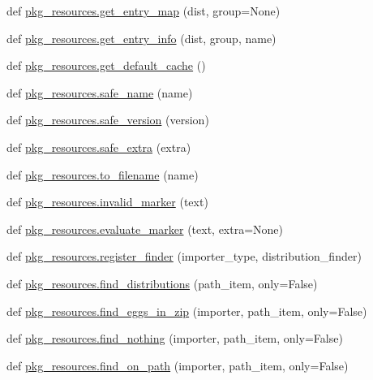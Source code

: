 \begin{DoxyCompactItemize}
\item 
def \hyperlink{namespacepkg__resources_ad16e5d5879cbf9b5302b755ae1d0e5c2}{pkg\+\_\+resources.\+get\+\_\+entry\+\_\+map} (dist, group=None)
\item 
def \hyperlink{namespacepkg__resources_afbe243e1bf56cc04e07807c30e8b8145}{pkg\+\_\+resources.\+get\+\_\+entry\+\_\+info} (dist, group, name)
\item 
def \hyperlink{namespacepkg__resources_a605d91f78bde46cd2f7db04c78b9c28c}{pkg\+\_\+resources.\+get\+\_\+default\+\_\+cache} ()
\item 
def \hyperlink{namespacepkg__resources_a9635d106e0984b74bbcd80646e7a7384}{pkg\+\_\+resources.\+safe\+\_\+name} (name)
\item 
def \hyperlink{namespacepkg__resources_a20ac952ffecf95bf3d88e9a15251ab80}{pkg\+\_\+resources.\+safe\+\_\+version} (version)
\item 
def \hyperlink{namespacepkg__resources_a60b77b0c5890f9f0087fe9b6055f138f}{pkg\+\_\+resources.\+safe\+\_\+extra} (extra)
\item 
def \hyperlink{namespacepkg__resources_a6c980c35b437e195d4ab09e4fac70626}{pkg\+\_\+resources.\+to\+\_\+filename} (name)
\item 
def \hyperlink{namespacepkg__resources_aeb46162da9479c499b4bac06b6ed557a}{pkg\+\_\+resources.\+invalid\+\_\+marker} (text)
\item 
def \hyperlink{namespacepkg__resources_a02ab4b058591e3461dc3653dc9a0c01d}{pkg\+\_\+resources.\+evaluate\+\_\+marker} (text, extra=None)
\item 
def \hyperlink{namespacepkg__resources_a64bf2dc95891c62e1b8bdfc0d67c21d5}{pkg\+\_\+resources.\+register\+\_\+finder} (importer\+\_\+type, distribution\+\_\+finder)
\item 
def \hyperlink{namespacepkg__resources_aeade0feaa17d259fd4a7bfa8f8c7383f}{pkg\+\_\+resources.\+find\+\_\+distributions} (path\+\_\+item, only=False)
\item 
def \hyperlink{namespacepkg__resources_a36b4f55e7e31b83cee4451daf5966e7f}{pkg\+\_\+resources.\+find\+\_\+eggs\+\_\+in\+\_\+zip} (importer, path\+\_\+item, only=False)
\item 
def \hyperlink{namespacepkg__resources_a755c41246e3f38059e8705eb3b39cb51}{pkg\+\_\+resources.\+find\+\_\+nothing} (importer, path\+\_\+item, only=False)
\item 
def \hyperlink{namespacepkg__resources_a27d55e99dedd8d8ac67c7bf8446ca396}{pkg\+\_\+resources.\+find\+\_\+on\+\_\+path} (importer, path\+\_\+item, only=False)
\item 

\end{DoxyCompactItemize}

